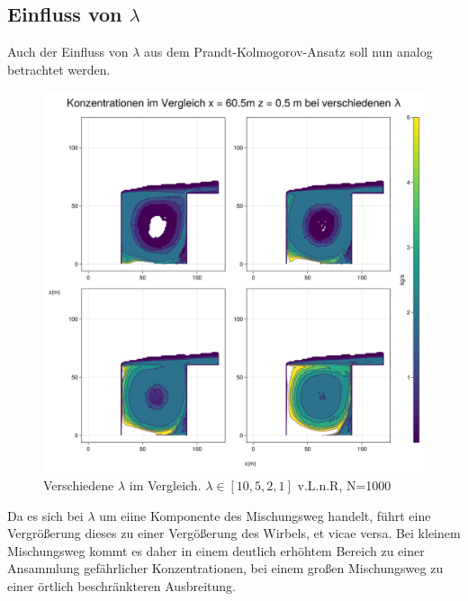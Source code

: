 \documentclass[ngerman]{scrartcl}
\begin{document}
\subsection{Einfluss von $\lambda$ }
Auch der Einfluss von $\lambda$ aus dem Prandt-Kolmogorov-Ansatz soll nun analog betrachtet werden. 
\begin{figure}[H]
	\centering
	\includegraphics[scale=0.25]{Bilder/3_lambda_x = 60.5.png}
	\caption{Verschiedene $\lambda$ im Vergleich. $\lambda \in[10,5 ,2,1]$ v.L.n.R, N=1000}
	\label{fig:my_label}
\end{figure}

Da es sich bei $\lambda$ um eiine Komponente des Mischungsweg handelt, führt eine Vergrößerung dieses zu einer Vergößerung des Wirbels, et vicae versa. Bei kleinem Mischungsweg kommt es daher in einem deutlich erhöhtem Bereich zu einer Ansammlung gefährlicher Konzentrationen, bei einem großen Mischungsweg zu einer örtlich beschränkteren Ausbreitung.
\end{document}
